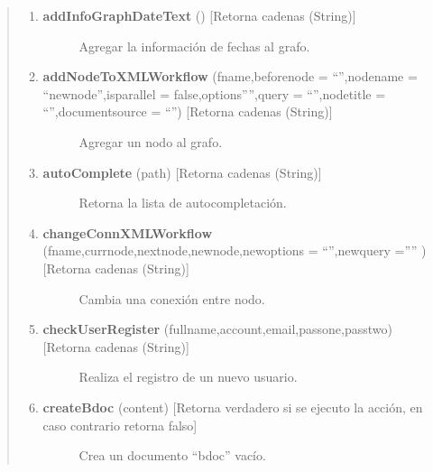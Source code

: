 \documentclass[letterpaper,11pt,spanish]{sphinxmanual}
\begin{document}
\begin{quote}
\begin{enumerate}
\item {} \begin{description}
\item[{\textbf{addInfoGraphDateText} () {[}Retorna cadenas (String){]}}] \leavevmode
Agregar la información de fechas al grafo.

\end{description}

\item {} \begin{description}
\item[{\textbf{addNodeToXMLWorkflow} (fname,beforenode = ``'',nodename = ``newnode'',isparallel = false,options'''',query = ``'',nodetitle = ``'',documentsource = ``'') {[}Retorna cadenas (String){]}}] \leavevmode
Agregar un nodo al grafo.

\end{description}

\item {} \begin{description}
\item[{\textbf{autoComplete} (path) {[}Retorna cadenas (String){]}}] \leavevmode
Retorna la lista de autocompletación.

\end{description}

\item {} \begin{description}
\item[{\textbf{changeConnXMLWorkflow} (fname,currnode,nextnode,newnode,newoptions = ``'',newquery ='''' ) {[}Retorna cadenas (String){]}}] \leavevmode
Cambia una conexión entre nodo.

\end{description}

\item {} \begin{description}
\item[{\textbf{checkUserRegister} (fullname,account,email,passone,passtwo) {[}Retorna cadenas (String){]}}] \leavevmode
Realiza el registro de un nuevo usuario.

\end{description}

\item {} \begin{description}
\item[{\textbf{createBdoc} (content) {[}Retorna verdadero si se ejecuto la acción, en caso contrario retorna falso{]}}] \leavevmode
Crea un documento ``bdoc'' vacío.


\end{description}
\end{enumerate}
\end{quote}
\end{document}
